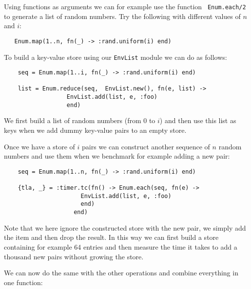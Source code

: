 \documentclass[a4paper,11pt]{article}
\begin{document}
Using functions as arguments we can for example use the function {\tt
  Enum.each/2} to generate a list of random numbers. Try the following
with different values of $n$ and $i$:

\begin{verbatim}
   Enum.map(1..n, fn(_) -> :rand.uniform(i) end)
\end{verbatim}

To build a key-value store using our {\tt EnvList} module we can do as follows:

\begin{verbatim}
    seq = Enum.map(1..i, fn(_) -> :rand.uniform(i) end)

    list = Enum.reduce(seq,  EnvList.new(), fn(e, list) -> 
                  EnvList.add(list, e, :foo) 
                  end)
\end{verbatim}

We first build a list of random numbers (from 0 to $i$) and then use
this list as keys when we add dummy key-value pairs to an empty store.

Once we have a store of $i$ pairs we can construct another sequence of $n$
random numbers and use them when we benchmark for example adding a new pair:

\begin{verbatim}
    seq = Enum.map(1..n, fn(_) -> :rand.uniform(i) end)
    
    {tla, _} = :timer.tc(fn() -> Enum.each(seq, fn(e) ->
                      EnvList.add(list, e, :foo)
                      end)
                    end)
\end{verbatim}

Note that we here ignore the constructed store with the new pair, we
simply add the item and then drop the result. In this way we can first
build a store containing for example 64 entries and then measure the
time it takes to add a thousand new pairs without growing the store.

We can now do the same with the other operations and combine everything
in one function:
\end{document}
